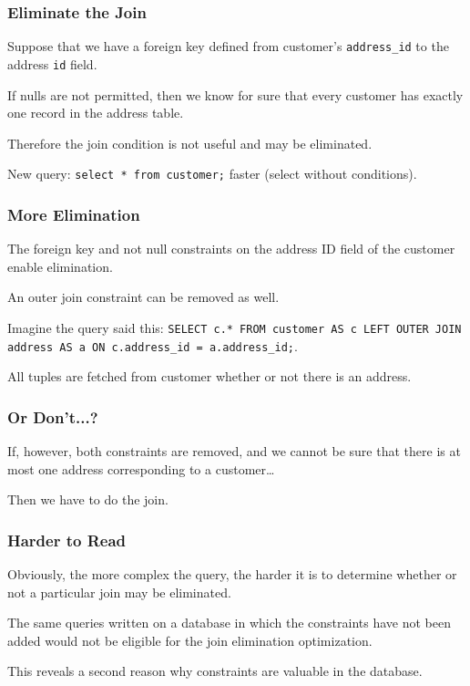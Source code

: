 \begin{frame}
\frametitle{Eliminate the Join}

Suppose that we have a foreign key defined from customer's \texttt{address\_id} to the address \texttt{id} field. 

If nulls are not permitted, then we know for sure that every customer has exactly one record in the address table.

Therefore the join condition is not useful and may be eliminated. 

New query: \texttt{select * from customer;} faster (select without conditions).


\end{frame}

\begin{frame}
\frametitle{More Elimination}

The foreign key and not null constraints on the address ID field of the customer enable elimination.

An outer join constraint can be removed as well.

Imagine the query said this: \texttt{SELECT c.* FROM customer AS c LEFT OUTER JOIN address AS a ON c.address\_id = a.address\_id;}. 

All tuples are fetched from customer whether or not there is an address. 

\end{frame}

\begin{frame}
\frametitle{Or Don't...?}

If, however, both constraints are removed, and we cannot be sure that there is at most one address corresponding to a customer\ldots

Then we have to do the join.


\end{frame}

\begin{frame}
\frametitle{Harder to Read}
Obviously, the more complex the query, the harder it is to determine whether or not a particular join may be eliminated. 

The same queries written on a database in which the constraints have not been added would not be eligible for the join elimination optimization. 

This reveals a second reason why constraints are valuable in the database.

\end{frame}

